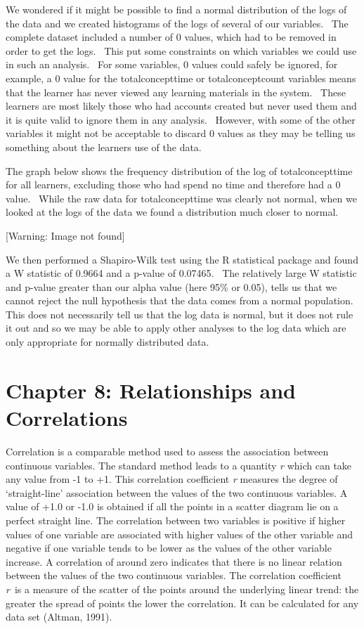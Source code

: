 \documentclass[12pt,twoside]{article}
\begin{document}
We wondered if it might be possible to find a normal distribution of the
logs of the data and we created histograms of the logs of several of
our variables.~ The complete dataset included a number of 0 values,
which had to be removed in order to get the logs.~ This put some
constraints on which variables we could use in such an analysis.~ For
some variables, 0 values could safely be ignored, for example, a 0
value for the totalconcepttime or totalconceptcount variables means
that the learner has never viewed any learning materials in the
system.~ These learners are most likely those who had accounts created
but never used them and it is quite valid to ignore them in any
analysis.~ However, with some of the other variables it might not be
acceptable to discard 0 values as they may be telling us something
about the learner{\textquotesingle}s use of the data.

The graph below shows the frequency distribution of the log of
totalconcepttime for all learners, excluding those who had spend no
time and therefore had a 0 value.~ While the raw data for
totalconcepttime was clearly not normal, when we looked at the logs of
the data we found a distribution much closer to normal.

 [Warning: Image not found]  

\bigskip

We then performed a Shapiro{}-Wilk test using the R statistical package
and found a W statistic of 0.9664 and a p{}-value of 0.07465.~ The
relatively large W statistic and p{}-value greater than our alpha value
(here 95\% or 0.05), tells us that we cannot reject the null hypothesis
that the data comes from a normal population.~ This does not
necessarily tell us that the log data is normal, but it does not rule
it out and so we may be able to apply other analyses to the log data
which are only appropriate for normally distributed data.


\bigskip

\section[Chapter 8: Relationships and Correlations ]{Chapter 8:
Relationships and Correlations }
Correlation is a comparable method used to assess the association
between continuous variables. The standard method leads to a quantity
\textit{r }which can take any value from {}-1 to +1. This correlation
coefficient \textit{r }measures the degree of `straight{}-line'
association between the values of the two continuous variables. A value
of +1.0 or {}-1.0 is obtained if all the points in a scatter diagram
lie on a perfect straight line. The correlation between two variables
is positive if higher values of one variable are associated with higher
values of the other variable and negative if one variable tends to be
lower as the values of the other variable increase. A correlation of
around zero indicates that there is no linear relation between the
values of the two continuous variables. The correlation coefficient
\textit{r}~is a measure of the scatter of the points around the
underlying linear trend: the greater the spread of points the lower the
correlation. It can be calculated for any data set (Altman, 1991). 
\end{document}
